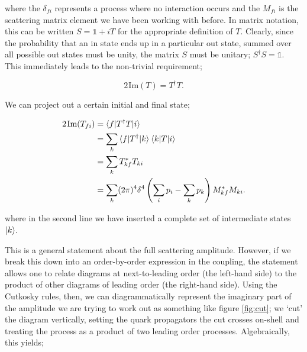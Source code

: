 where the $\delta_{fi}$ represents a process where no interaction occurs and the $M_{fi}$ is the scattering matrix element we have been working with before. In matrix notation, this can be written $S = \mathbb{1} + i T$ for the appropriate definition of $T$. Clearly, since the probability that an in state ends up in a particular out state, summed over all possible out states must be unity, the matrix $S$ must be unitary; $S^\dagger S = \mathbb{1}$. This immediately leads to the non-trivial requirement;

\begin{equation}
2 \hspace{1pt} \text{Im}(T) = T^\dagger T.
\end{equation}

We can project out a certain initial and final state;

\begin{equation}
\begin{split}
2 \hspace{1pt} \text{Im}(T_{fi}) &= \mathinner{\langle f\vert T^\dagger T\vert i\rangle}_{} \\
&= \sum_{k} \mathinner{\langle f\vert T^\dagger\vert k\rangle}_{} \mathinner{\langle k\vert T\vert i\rangle}_{} \\
&= \sum_k T_{kf}^* T_{ki} \\
&= \sum_k (2 \pi)^4 \delta^4 \left(\sum_{i} p_i - \sum_{k} p_k \right) M_{kf}^*M_{ki}.
\end{split}
\end{equation}

where in the second line we have inserted a complete set of intermediate states $\mathinner{\lvert k\rangle}_{\hspace{-0.1em}}$.

This is a general statement about the full scattering amplitude. However, if we break this down into an order-by-order expression in the coupling, the statement allows one to relate diagrams at next-to-leading order (the left-hand side) to the product of other diagrams of leading order (the right-hand side). Using the Cutkosky rules, then, we can diagrammatically represent the imaginary part of the amplitude we are trying to work out as something like figure \ref{fig:cut}; we `cut' the diagram vertically, setting the quark propagators the cut crosses on-shell and treating the process as a product of two leading order processes. Algebraically, this yields;


